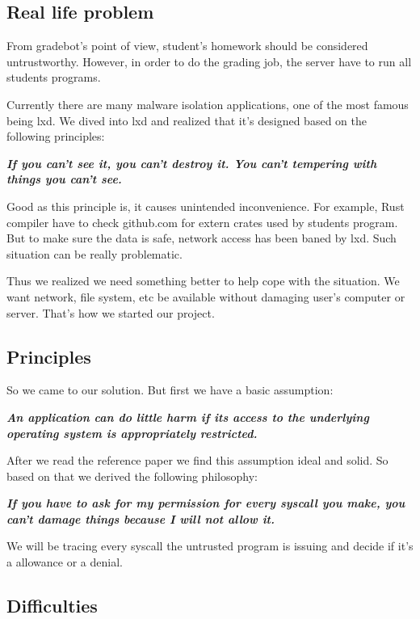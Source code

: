 \documentclass[conference,compsoc]{IEEEtran}
\begin{document}
	\subsection{Real life problem}
		\par
			From gradebot's point of view, student's homework should be considered untrustworthy. 
			However, in order to do the grading job, the server have to run all students programs.
		\par
			Currently there are many malware isolation applications, one of the most famous being lxd. 
			We dived into lxd and realized that it's designed based on the following principles:
		\par 
			\emph{\textbf{
				If you can't see it, you can't destroy it. 
				You can't tempering with things you can't see.
			}}
		\par
			Good as this principle is, it causes unintended inconvenience. 
			For example, Rust compiler have to check github.com for extern crates used by students program. 
			But to make sure the data is safe, network access has been baned by lxd. 
			Such situation can be really problematic.
		\par
			Thus we realized we need something better to help cope with the situation. 
			We want network, file system, etc be available without damaging user's computer or server. 
			That's how we started our project.
		\subsection{Principles}
			\par
				So we came to our solution. 
				But first we have a basic assumption:
			\par
				\emph{\textbf{
					An application can do little harm if its access to the underlying operating system is appropriately restricted.\cite{SecSandBox}
				}}
			\par
				After we read the reference paper we find this assumption ideal and solid. 
				So based on that we derived the following philosophy:
			\par
				\emph{\textbf{
					If you have to ask for my permission for every syscall you make, you can't damage things because I will not allow it.
				}}
			\par
				We will be tracing every syscall the untrusted program is issuing and decide if it's a allowance or a denial.
	\subsection{Difficulties}
\end{document}
